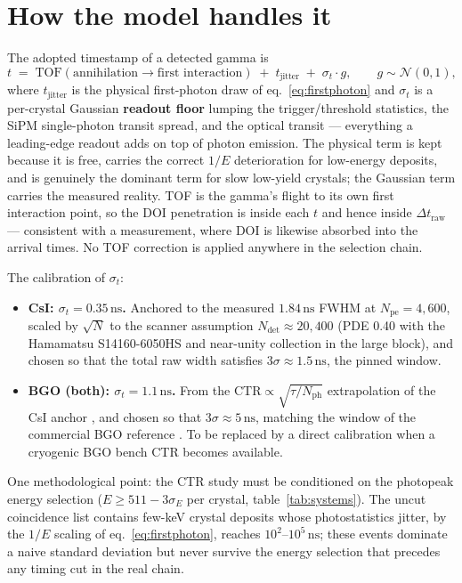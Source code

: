 \documentclass[11pt,a4paper]{article}
\newcommand{\Ndet}{N_{\mathrm{det}}}
\newcommand{\ns}{\,\mathrm{ns}}
\begin{document}
\section{How the model handles it}
\label{sec:model}

The adopted timestamp of a detected gamma is
\begin{equation}
  t \;=\; \mathrm{TOF}(\text{annihilation} \to \text{first interaction})
     \;+\; t_{\mathrm{jitter}}
     \;+\; \sigma_t \cdot g, \qquad g \sim \mathcal{N}(0,1),
  \label{eq:stamp}
\end{equation}
where $t_{\mathrm{jitter}}$ is the physical first-photon draw of eq.~\eqref{eq:firstphoton}
and $\sigma_t$ is a per-crystal Gaussian \textbf{readout floor} lumping the trigger/threshold
statistics, the SiPM single-photon transit spread, and the optical transit --- everything a
leading-edge readout adds on top of photon emission. The physical term is kept because it is
free, carries the correct $1/E$ deterioration for low-energy deposits, and is genuinely the
dominant term for slow low-yield crystals; the Gaussian term carries the measured reality.
TOF is the gamma's flight to its own first interaction point, so the DOI penetration is
inside each $t$ and hence inside $\Delta t_{\mathrm{raw}}$ --- consistent with a measurement,
where DOI is likewise absorbed into the arrival times. No TOF correction is applied anywhere
in the selection chain.

The calibration of $\sigma_t$:
\begin{itemize}
\item \textbf{CsI: $\sigma_t = 0.35\ns$.} Anchored to the measured $1.84\ns$ FWHM
  \cite{Soleti2024} at $N_{\mathrm{pe}} = 4{,}600$, scaled by
  $\sqrt{N}$ to the scanner assumption $\Ndet \approx 20{,}400$
  (PDE 0.40 with the Hamamatsu S14160-6050HS and near-unity collection in the large block),
  and chosen so that the total raw width satisfies $3\sigma \approx 1.5\ns$, the pinned window.
\item \textbf{BGO (both): $\sigma_t = 1.1\ns$.} From the $\mathrm{CTR} \propto
  \sqrt{\tau/N_{\mathrm{ph}}}$ extrapolation of the CsI anchor \cite{Conti2009}, and chosen so
  that $3\sigma \approx 5\ns$, matching the window of the commercial BGO reference
  \cite{Yamagishi2023}. To be replaced by a direct calibration when a cryogenic BGO bench CTR
  becomes available.
\end{itemize}

One methodological point: the CTR study must be conditioned on the photopeak energy selection
($E \ge 511 - 3\sigma_E$ per crystal, table~\ref{tab:systems}). The uncut coincidence list
contains few-keV crystal deposits whose photostatistics jitter, by the $1/E$ scaling of
eq.~\eqref{eq:firstphoton}, reaches $10^2$--$10^5\ns$; these events dominate a naive standard
deviation but never survive the energy selection that precedes any timing cut in the real
chain.
\end{document}
